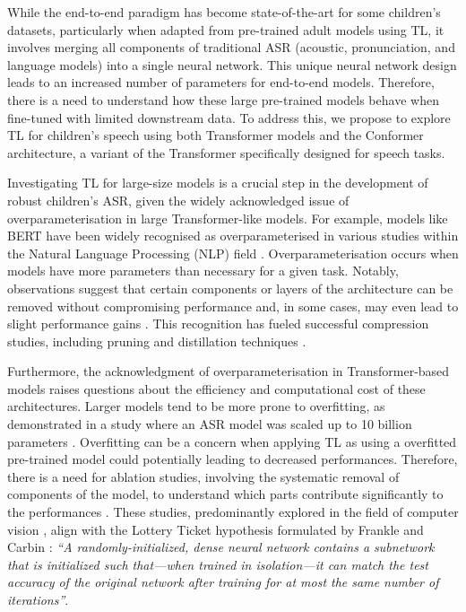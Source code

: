 While the end-to-end paradigm has become state-of-the-art for some children's datasets, particularly when adapted from pre-trained adult models using TL, it involves merging all components of traditional ASR (acoustic, pronunciation, and language models) into a single neural network. This unique neural network design leads to an increased number of parameters for end-to-end models. Therefore, there is a need to understand how these large pre-trained models behave when fine-tuned with limited downstream data. To address this, we propose to explore TL for children's speech using both Transformer models and the Conformer architecture, a variant of the Transformer specifically designed for speech tasks.


Investigating TL for large-size models is a crucial step in the development of robust children's ASR, given the widely acknowledged issue of overparameterisation in large Transformer-like models. For example, models like BERT \cite{Bert} have been widely recognised as overparameterised in various studies within the Natural Language Processing (NLP) field \cite{kovaleva-etal-2019-revealing,michel2019sixteen}. Overparameterisation occurs when models have more parameters than necessary for a given task. Notably, observations suggest that certain components or layers of the architecture can be removed without compromising performance and, in some cases, may even lead to slight performance gains \cite{kovaleva-etal-2019-revealing,michel2019sixteen,ye2023partial}. This recognition has fueled successful compression studies, including pruning and distillation techniques \cite{mccarley2019structured,sanh2019distilbert}.



Furthermore, the acknowledgment of overparameterisation in Transformer-based models raises questions about the efficiency and computational cost of these architectures. Larger models tend to be more prone to overfitting, as demonstrated in a study where an ASR model was scaled up to 10 billion parameters \cite{zheng22d_interspeech}. Overfitting can be a concern when applying TL as using a overfitted pre-trained model could potentially leading to decreased performances. Therefore, there is a need for ablation studies, involving the systematic removal of components of the model, to understand which parts contribute significantly to the performances \cite{shen2021partial,wang2021fine}. These studies, predominantly explored in the field of computer vision \cite{ye2023partial}, align with the Lottery Ticket hypothesis formulated by Frankle and Carbin \cite{frankle2018lottery}: \textit{``A randomly-initialized, dense neural network contains a subnetwork that is initialized such that—when trained in isolation—it can match the test accuracy of the original network after training for at most the same number of iterations''}.

